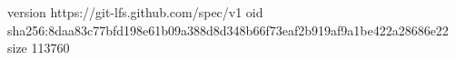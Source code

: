version https://git-lfs.github.com/spec/v1
oid sha256:8daa83c77bfd198e61b09a388d8d348b66f73eaf2b919af9a1be422a28686e22
size 113760
